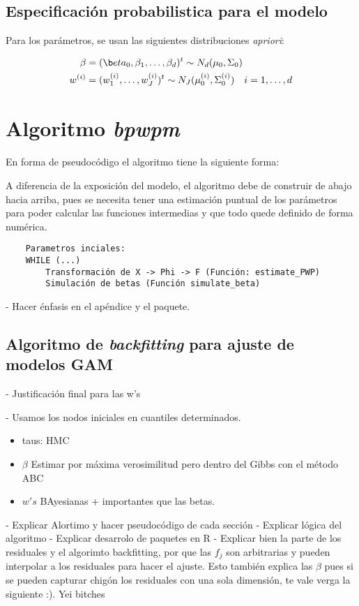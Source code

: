 \documentclass[../Main/Main.tex]{subfiles}
\begin{document}
\subsection{Especificación probabilistica para el modelo}
Para los parámetros, se usan las siguientes distribuciones \textit{apriori}:

\begin{align}
	\mathbf{\beta} &= (\b	eta_0,\beta_1,\ldots,\beta_d)^t \sim N_d(\mu_0, \Sigma_0) \\
	w\superi &= (w\superi_1,\ldots,w\superi_J)^t \sim N_J(\mu\superi_0,\Sigma\superi_0) \quad i=1,\ldots,d
\end{align}

\section{Algoritmo \textit{bpwpm}}
En forma de pseudocódigo el algoritmo tiene la siguiente forma:

A diferencia de la exposición del modelo, el algoritmo debe de construir de abajo hacia arriba, pues se necesita tener una estimación puntual de los parámetros para poder calcular las funciones intermedias y que todo quede definido de forma numérica. 

\begin{verbatim}
    Parametros inciales: 
    WHILE (...)
        Transformación de X -> Phi -> F (Función: estimate_PWP)		
        Simulación de betas (Función simulate_beta)
\end{verbatim} 

- Hacer énfasis en el apéndice y el paquete.

\subsection{Algoritmo de \textit{backfitting} para ajuste de modelos GAM} 
- Justificación final para las w's

- Usamos los nodos iniciales en cuantiles determinados.\\
\begin{itemize}
\item taus: HMC
\item $\beta$ Estimar por máxima verosimilitud pero dentro del Gibbs con el método ABC
\item $w's$ BAyesianas + importantes que las betas.
\end{itemize}

- Explicar Alortimo y hacer pseudocódigo de cada sección
- Explicar lógica del algoritmo
- Explicar desarrolo de paquetes en R
- Explicar bien la parte de los residuales y el algorimto backfitting, por que las $f_j$ son arbitrarias y pueden interpolar a los residuales para hacer el ajuste. Esto también explica las $\beta$ pues si se pueden capturar chigón los residuales con una sola dimensión, te vale verga la siguiente :). Yei bitches
\end{document}
